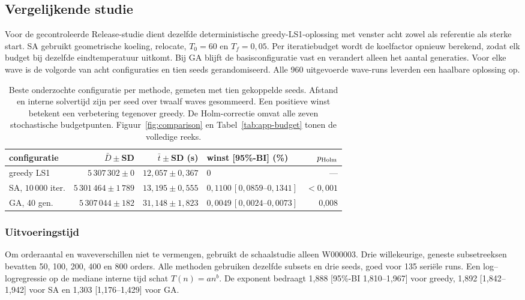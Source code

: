 \documentclass[a4paper,11pt]{article}
\begin{document}
\subsection{Vergelijkende studie}
Voor de gecontroleerde Release-studie dient dezelfde deterministische
greedy-LS1-oplossing met venster acht zowel als referentie als sterke start. SA
gebruikt geometrische koeling, relocate, $T_0=60$ en $T_f=0,05$. Per
iteratiebudget wordt de koelfactor opnieuw berekend, zodat elk budget bij
dezelfde eindtemperatuur uitkomt. Bij GA blijft de basisconfiguratie vast en
verandert alleen het aantal generaties. Voor elke wave is de volgorde van acht
configuraties en tien seeds gerandomiseerd. Alle 960 uitgevoerde wave-runs
leverden een haalbare oplossing op.

\begin{table}[H]
\centering
\small
\setlength{\tabcolsep}{3.5pt}
\begin{tabular}{@{}lrrlr@{}}
\toprule
\textbf{configuratie} & \textbf{$\bar D\pm$SD} & \textbf{$\bar t\pm$SD (s)} &
\textbf{winst [95\%-BI] (\%)} & \textbf{$p_{\rm Holm}$} \\
\midrule
greedy LS1 & $5\,307\,302\pm0$ & $12,057\pm0,367$ & 0 & --- \\
SA, $10\,000$ iter. & $5\,301\,464\pm1\,789$ & $13,195\pm0,555$ & $0,1100\,[0,0859\text{--}0,1341]$ & $<0,001$ \\
GA, 40 gen. & $5\,307\,044\pm182$ & $31,148\pm1,823$ & $0,0049\,[0,0024\text{--}0,0073]$ & 0,008 \\
\bottomrule
\end{tabular}
\caption{Beste onderzochte configuratie per methode, gemeten met tien gekoppelde
seeds. Afstand en interne solvertijd zijn per seed over twaalf waves
gesommeerd. Een positieve winst betekent een verbetering tegenover greedy. De
Holm-correctie omvat alle zeven stochastische budgetpunten. Figuur~\ref{fig:comparison}
en Tabel~\ref{tab:app-budget} tonen de volledige reeks.}
\label{tab:comparison}
\end{table}

\subsubsection{Uitvoeringstijd}
Om orderaantal en waveverschillen niet te vermengen, gebruikt de schaalstudie
alleen W000003. Drie willekeurige, geneste subsetreeksen bevatten 50, 100, 200,
400 en 800 orders. Alle methoden gebruiken dezelfde subsets en drie seeds, goed
voor 135 seriële runs. Een log--logregressie op de mediane interne tijd schat
$T(n)=an^b$. De exponent bedraagt 1,888 [95\%-BI 1,810--1,967] voor greedy,
1,892 [1,842--1,942] voor SA en 1,303 [1,176--1,429] voor GA.
\end{document}
